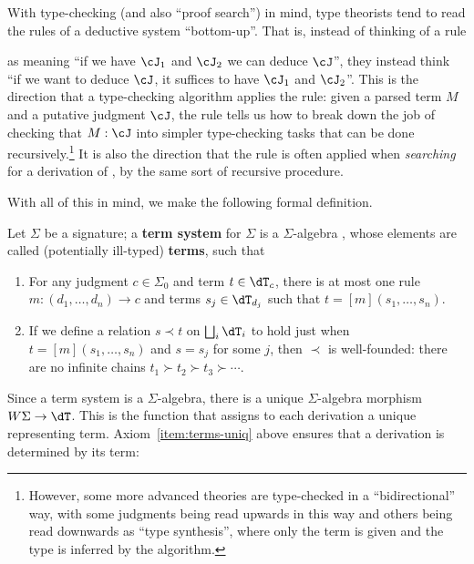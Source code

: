 \documentclass{book}
\def\sig{\Sigma}
\def\act#1{[#1]}
\newcommand{\precsym}[1]{\mathord{\circ}#1}
\let\preceeds\prec
\renewcommand{\prec}[2]{(#1)\precsym{#2}}
\begin{document}
With type-checking (and also ``proof search'') in mind, type theorists tend to read the rules of a deductive system ``bottom-up''.
That is, instead of thinking of a rule
\begin{mathpar}
\end{mathpar}
as meaning ``if we have $\cJ_1$ and $\cJ_2$ we can deduce $\cJ$'', they instead think ``if we want to deduce $\cJ$, it suffices to have $\cJ_1$ and $\cJ_2$''.
This is the direction that a type-checking algorithm applies the rule: given a parsed term $M$ and a putative judgment $\cJ$, the rule tells us how to break down the job of checking that $M:\cJ$ into simpler type-checking tasks that can be done recursively.\footnote{However, some more advanced theories are type-checked in a ``bidirectional'' way, with some judgments being read upwards in this way and others being read downwards as ``type synthesis'', where only the term is given and the type is inferred by the algorithm.}
It is also the direction that the rule is often applied when \emph{searching} for a derivation of \cJ, by the same sort of recursive procedure.

With all of this in mind, we make the following formal definition.

\begin{defn}\label{defn:terms}
  Let $\sig$ be a signature; a \textbf{term system} for $\sig$ is a $\sig$-algebra \dT, whose elements are called (potentially ill-typed) \textbf{terms}, such that
  \begin{enumerate}
  \item For any judgment $c\in\sig_0$ and term $t\in \dT_c$, there is at most one rule $m:(d_1,\dots,d_n)\to c$ and terms $s_j\in \dT_{d_j}$ such that $t = \act m(s_1,\dots,s_n)$.\label{item:terms-uniq}
  \item If we define a relation $s\preceeds t$ on $\bigsqcup_i \dT_i$ to hold just when $t = \act m(s_1,\dots,s_n)$ and $s=s_j$ for some $j$, then $\preceeds$ is well-founded: there are no infinite chains $t_1 \succ t_2 \succ t_3 \succ \cdots$.\label{item:term-wf}
  \end{enumerate}
\end{defn}

Since a term system \dT is a $\sig$-algebra, there is a unique $\sig$-algebra morphism $W\sig \to \dT$.
This is the function that assigns to each derivation a unique representing term.
Axiom~\ref{item:terms-uniq} above ensures that a derivation is determined by its term:
\end{document}

